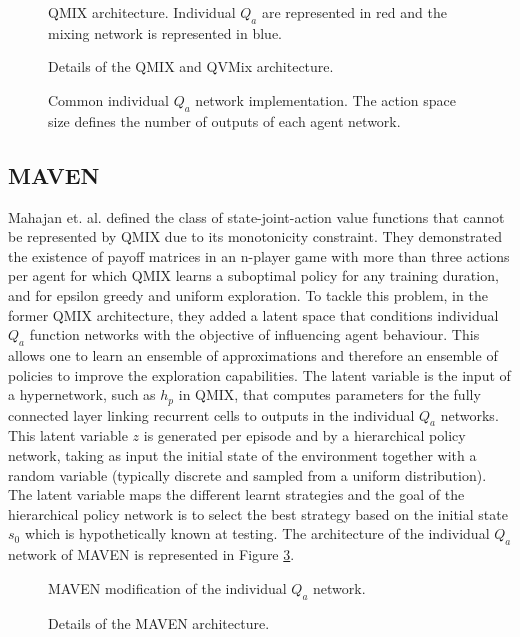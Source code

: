 \begin{figure}[ht]
\centering

\caption{QMIX architecture. Individual $Q_a$ are represented in red and the mixing network is represented in blue.}
\label{fig:qmix}
\caption{Details of the QMIX and QVMix architecture.}
\end{figure}

\begin{figure}[t]
    \centering

\caption{Common individual $Q_a$ network implementation. The action space size defines the number of outputs of each agent network.}
\label{fig:indivQ}
\end{figure}

\subsection{MAVEN}
Mahajan et. al. \cite{Mahajan2019MAVEN:Exploration} defined the class of state-joint-action value functions that cannot be represented by QMIX due to its monotonicity constraint.
They demonstrated the existence of payoff matrices in an n-player game with more than three actions per agent for which QMIX learns a suboptimal policy for any training duration, and for epsilon greedy and uniform exploration.
To tackle this problem, in the former QMIX architecture, they added a latent space that conditions individual $Q_a$ function networks with the objective of influencing agent behaviour.
This allows one to learn an ensemble of approximations and therefore an ensemble of policies to improve the exploration capabilities.
The latent variable is the input of a hypernetwork, such as $h_p$ in QMIX, that computes parameters for the fully connected layer linking recurrent cells to outputs in the individual $Q_a$ networks.
This latent variable $z$ is generated per episode and by a hierarchical policy network, taking as input the initial state of the environment together with a random variable (typically discrete and sampled from a uniform distribution).
The latent variable maps the different learnt strategies and the goal of the hierarchical policy network is to select the best strategy based on the initial state $s_0$ which is hypothetically known at testing.
The architecture of the individual $Q_a$ network of MAVEN is represented in Figure \ref{fig:maven}.

\begin{figure}[ht]
\centering

\caption{MAVEN modification of the individual $Q_a$ network.}
\label{fig:maven}

\caption{Details of the MAVEN architecture.}
\end{figure}

